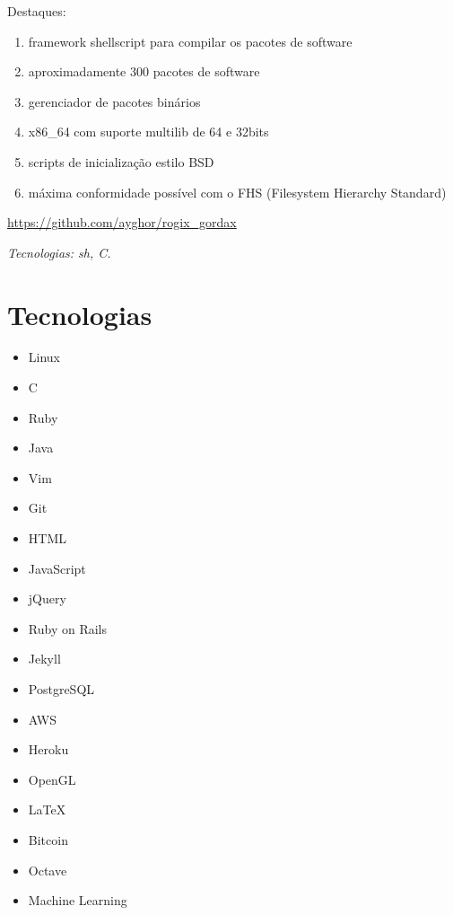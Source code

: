 \documentclass[a4paper]{simplecv}
\begin{document}
\begin{topic}
	Destaques:

	\begin{enumerate}
		\item framework shellscript para compilar os pacotes de
			software

		\item aproximadamente 300 pacotes de software

		\item gerenciador de pacotes binários

		\item x86\_64 com suporte multilib de 64 e 32bits

		\item scripts de inicialização estilo BSD

		\item máxima conformidade possível com o FHS (Filesystem
			Hierarchy Standard)
	\end{enumerate}

	{\scriptsize\url{https://github.com/ayghor/rogix\_gordax}}

	{\em\scriptsize Tecnologias: sh, C.}

\end{topic}

\section{Tecnologias}

\begin{multicols}{3}
	\raggedcolumns
	\begin{itemize}
		\item Linux
		\item C
		\item Ruby
		\item Java
		\item Vim
		\item Git
		\item HTML
		\item JavaScript
		\item jQuery
		\item Ruby on Rails
		\item Jekyll
		\item PostgreSQL
		\item AWS
		\item Heroku
		\item OpenGL
		\item \LaTeX{}
		\item Bitcoin
		\item Octave
		\item Machine Learning
	\end{itemize}
\end{multicols}
\end{document}
